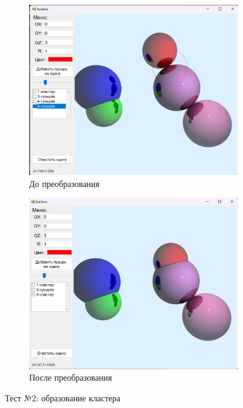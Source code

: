 \begin{figure}[h]
	\centering
	\begin{subfigure}{0.45\textwidth}
		\includegraphics[width=\linewidth]{pictures/test2_1.png}
		\caption{До преобразования}
		\label{fig:2first}
	\end{subfigure}
	\hfill
	\begin{subfigure}{0.45\textwidth}
		\includegraphics[width=\linewidth]{pictures/test2_2.png}
		\caption{После преобразования}
		\label{fig:2second}
	\end{subfigure}
	\caption{Тест №2: образование кластера}
	\label{fig:test2}
\end{figure}
